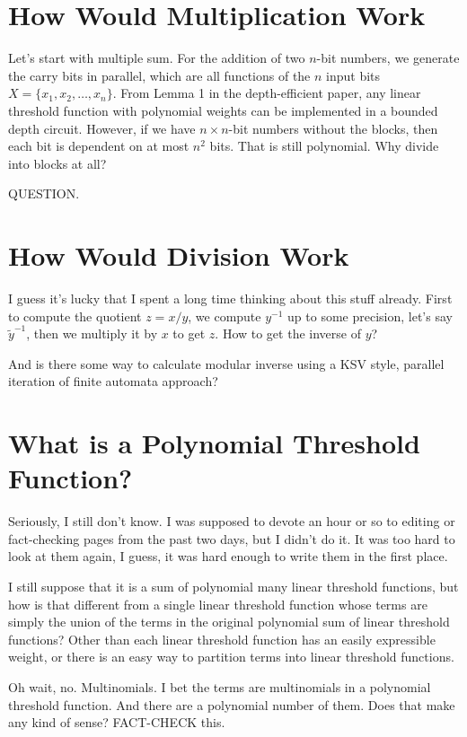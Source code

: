\documentclass{article}
\begin{document}
\section{How Would Multiplication Work}

Let's start with multiple sum. For the addition of two $n$-bit numbers,
we generate the carry bits in parallel, which are all functions of
the $n$ input bits $X = \{x_1, x_2, \ldots, x_n\}$. From Lemma 1 in the
depth-efficient paper, any linear threshold function with polynomial 
weights can be implemented in a bounded depth circuit. However, if we
have $n \times n$-bit numbers without the blocks, then each bit is
dependent on at most $n^2$ bits. That is still polynomial.
Why divide into blocks at all?

QUESTION.

\section{How Would Division Work}

I guess it's lucky that I spent a long time thinking about this stuff
already. First to compute the quotient $z = x/y$, we compute $y^{-1}$ up to
some precision, let's say $\tilde{y}^{-1}$, then we multiply it by $x$
to get $z$. How to get the inverse of $y$?

And is there some way to calculate modular inverse using a KSV style,
parallel iteration of finite automata approach?

\section{What is a Polynomial Threshold Function?}

Seriously, I still don't know. I was supposed to devote an hour or so to
editing or fact-checking pages from the past two days, but I didn't do it.
It was too hard to look at them again, I guess, it was hard enough to
write them in the first place.

I still suppose that it is a sum of polynomial many linear threshold 
functions, but how is that different from a single linear threshold function
whose terms are simply the union of the terms in the original polynomial
sum of linear threshold functions? Other than each linear threshold function
has an easily expressible weight, or there is an easy way to partition terms
into linear threshold functions.

Oh wait, no. Multinomials. I bet the terms are multinomials in a polynomial
threshold function. And there are a polynomial number of them. Does that
make any kind of sense? FACT-CHECK this.
\end{document}
